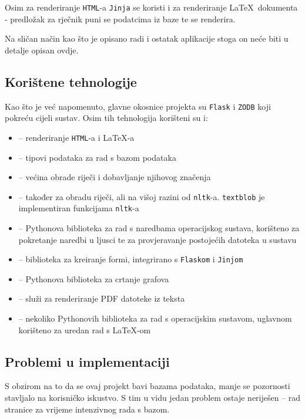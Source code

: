 \documentclass{foi}
\begin{document}
Osim za renderiranje \texttt{HTML}-a \texttt{Jinja} se koristi i za
renderiranje \LaTeX\ dokumenta - predložak za rječnik puni se podatcima iz baze
te se renderira.

Na sličan način kao što je opisano radi i ostatak aplikacije stoga on neće biti
u detalje opisan ovdje.

\subsection{Korištene tehnologije}

Kao što je već napomenuto, glavne okosnice projekta su \texttt{Flask} i
\texttt{ZODB} koji pokreću cijeli sustav. Osim tih tehnologija korišteni su i:
\begin{itemize}
	\item[\texttt{Jinja}] -- renderiranje \texttt{HTML}-a i \LaTeX-a
	\item[\texttt{persistent}] -- tipovi podataka za rad s bazom podataka
	\item[\texttt{nltk}] -- većina obrade riječi i dobavljanje njihovog
		značenja
	\item[\texttt{textblob}] -- također za obradu riječi, ali na višoj
		razini od \texttt{nltk}-a. \texttt{textblob} je implementiran
		funkcijama \texttt{nltk}-a
	\item[\texttt{os}] -- Pythonova biblioteka za rad s naredbama
		operacijskog sustava, korišteno za pokretanje naredbi u ljusci
		te za provjeravanje postojećih datoteka u sustavu
	\item[\texttt{wtforms}] -- biblioteka za kreiranje formi, integrirano s
		\texttt{Flaskom} i \texttt{Jinjom}
	\item[\texttt{matplotlib}] -- Pythonova biblioteka za crtanje grafova
	\item[\LaTeX] -- služi za renderiranje PDF datoteke iz teksta
	\item[ostalo] -- nekoliko Pythonovih biblioteka za rad s operacijskim
		sustavom, uglavnom korišteno za uredan rad s \LaTeX-om
\end{itemize}

\subsection{Problemi u implementaciji}

S obzirom na to da se ovaj projekt bavi bazama podataka, manje se pozornosti
stavljalo na korisničko iskustvo. S tim u vidu jedan problem ostaje neriješen
-- rad stranice za vrijeme intenzivnog rada s bazom.
\end{document}
